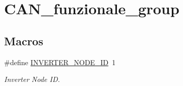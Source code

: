 \hypertarget{group___c_a_n__funzionale__group}{\section{C\-A\-N\-\_\-funzionale\-\_\-group}
\label{group___c_a_n__funzionale__group}
}
\subsection*{Macros}
\begin{DoxyCompactItemize}
\item 
\hypertarget{group___c_a_n__funzionale__group_ga59ea82aec4abe07072cbdad555a8c1b9}{\#define \hyperlink{group___c_a_n__funzionale__group_ga59ea82aec4abe07072cbdad555a8c1b9}{I\-N\-V\-E\-R\-T\-E\-R\-\_\-\-N\-O\-D\-E\-\_\-\-I\-D}~1}\label{group___c_a_n__funzionale__group_ga59ea82aec4abe07072cbdad555a8c1b9}

\begin{DoxyCompactList}\small\item\em Inverter Node I\-D. \end{DoxyCompactList}\end{DoxyCompactItemize}
